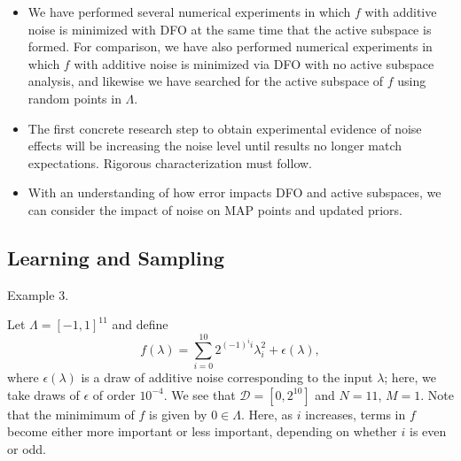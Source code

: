 \documentclass[11pt]{beamer}
\begin{document}
\begin{frame}

\begin{itemize}

	\item We have performed several numerical experiments in which $f$ with additive noise is minimized with DFO at the same time that the active subspace is formed. For comparison, we have also performed numerical experiments in which $f$ with additive noise is minimized via DFO with no active subspace analysis, and likewise we have searched for the active subspace of $f$ using random points in $\Lambda$.
	


	\item The first concrete research step to obtain experimental evidence of noise effects will be increasing the noise level until results no longer match expectations. Rigorous characterization must follow.
	
	\item With an understanding of how error impacts DFO and active subspaces, we can consider the impact of noise on MAP points and updated priors.


\end{itemize}

\end{frame}

\subsection{Learning and Sampling}

\begin{frame}

\begin{block}{Example 3.}


Let $\Lambda=[-1,1]^{11}$ and define $$f(\lambda)=\sum_{i=0}^{10} 2^{(-1)^i i}\lambda_i^2+\epsilon(\lambda),$$ where $\epsilon(\lambda)$ is a draw of additive noise corresponding to the input $\lambda$; here, we take draws of $\epsilon$ of order $10^{-4}$. We see that $\mathcal{D}=[0,2^{10}]$ and $N=11$, $M=1$. Note that the minimimum of $f$ is given by $0 \in \Lambda$. Here, as $i$ increases, terms in $f$ become either more important or less important, depending on whether $i$ is even or odd.

\end{block}

\end{frame}
\end{document}
